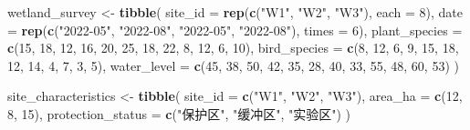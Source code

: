 \documentclass[
]{book}
\newenvironment{Shaded}{\begin{snugshade}}{\end{snugshade}}
\newcommand{\AttributeTok}[1]{\textcolor[rgb]{0.13,0.29,0.53}{#1}}
\newcommand{\DecValTok}[1]{\textcolor[rgb]{0.00,0.00,0.81}{#1}}
\newcommand{\FunctionTok}[1]{\textcolor[rgb]{0.13,0.29,0.53}{\textbf{#1}}}
\newcommand{\NormalTok}[1]{#1}
\newcommand{\OtherTok}[1]{\textcolor[rgb]{0.56,0.35,0.01}{#1}}
\newcommand{\StringTok}[1]{\textcolor[rgb]{0.31,0.60,0.02}{#1}}
\begin{document}
\begin{Shaded}
\begin{Highlighting}[]
\NormalTok{wetland\_survey }\OtherTok{\textless{}{-}} \FunctionTok{tibble}\NormalTok{(}
  \AttributeTok{site\_id =} \FunctionTok{rep}\NormalTok{(}\FunctionTok{c}\NormalTok{(}\StringTok{"W1"}\NormalTok{, }\StringTok{"W2"}\NormalTok{, }\StringTok{"W3"}\NormalTok{), }\AttributeTok{each =} \DecValTok{8}\NormalTok{),}
  \AttributeTok{date =} \FunctionTok{rep}\NormalTok{(}\FunctionTok{c}\NormalTok{(}\StringTok{"2022{-}05"}\NormalTok{, }\StringTok{"2022{-}08"}\NormalTok{, }\StringTok{"2022{-}05"}\NormalTok{, }\StringTok{"2022{-}08"}\NormalTok{), }\AttributeTok{times =} \DecValTok{6}\NormalTok{),}
  \AttributeTok{plant\_species =} \FunctionTok{c}\NormalTok{(}\DecValTok{15}\NormalTok{, }\DecValTok{18}\NormalTok{, }\DecValTok{12}\NormalTok{, }\DecValTok{16}\NormalTok{, }\DecValTok{20}\NormalTok{, }\DecValTok{25}\NormalTok{, }\DecValTok{18}\NormalTok{, }\DecValTok{22}\NormalTok{, }\DecValTok{8}\NormalTok{, }\DecValTok{12}\NormalTok{, }\DecValTok{6}\NormalTok{, }\DecValTok{10}\NormalTok{),}
  \AttributeTok{bird\_species =} \FunctionTok{c}\NormalTok{(}\DecValTok{8}\NormalTok{, }\DecValTok{12}\NormalTok{, }\DecValTok{6}\NormalTok{, }\DecValTok{9}\NormalTok{, }\DecValTok{15}\NormalTok{, }\DecValTok{18}\NormalTok{, }\DecValTok{12}\NormalTok{, }\DecValTok{14}\NormalTok{, }\DecValTok{4}\NormalTok{, }\DecValTok{7}\NormalTok{, }\DecValTok{3}\NormalTok{, }\DecValTok{5}\NormalTok{),}
  \AttributeTok{water\_level =} \FunctionTok{c}\NormalTok{(}\DecValTok{45}\NormalTok{, }\DecValTok{38}\NormalTok{, }\DecValTok{50}\NormalTok{, }\DecValTok{42}\NormalTok{, }\DecValTok{35}\NormalTok{, }\DecValTok{28}\NormalTok{, }\DecValTok{40}\NormalTok{, }\DecValTok{33}\NormalTok{, }\DecValTok{55}\NormalTok{, }\DecValTok{48}\NormalTok{, }\DecValTok{60}\NormalTok{, }\DecValTok{53}\NormalTok{)}
\NormalTok{)}

\NormalTok{site\_characteristics }\OtherTok{\textless{}{-}} \FunctionTok{tibble}\NormalTok{(}
  \AttributeTok{site\_id =} \FunctionTok{c}\NormalTok{(}\StringTok{"W1"}\NormalTok{, }\StringTok{"W2"}\NormalTok{, }\StringTok{"W3"}\NormalTok{),}
  \AttributeTok{area\_ha =} \FunctionTok{c}\NormalTok{(}\DecValTok{12}\NormalTok{, }\DecValTok{8}\NormalTok{, }\DecValTok{15}\NormalTok{),}
  \AttributeTok{protection\_status =} \FunctionTok{c}\NormalTok{(}\StringTok{"保护区"}\NormalTok{, }\StringTok{"缓冲区"}\NormalTok{, }\StringTok{"实验区"}\NormalTok{)}
\NormalTok{)}
\end{Highlighting}
\end{Shaded}
\end{document}
